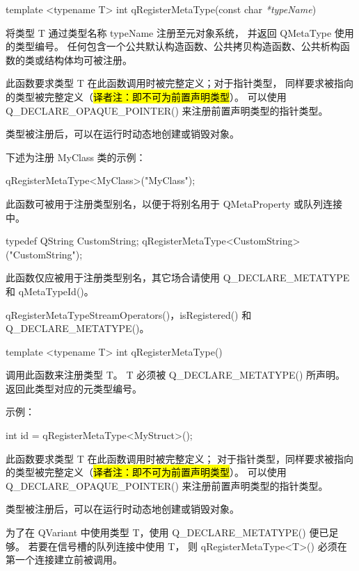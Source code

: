 template <typename T> int qRegisterMetaType(const char \emph{*typeName})

将类型 T 通过类型名称 typeName 注册至元对象系统，
并返回 QMetaType 使用的类型编号。
任何包含一个公共默认构造函数、公共拷贝构造函数、公共析构函数的类或结构体均可被注册。

此函数要求类型 T 在此函数调用时被完整定义；对于指针类型，
同样要求被指向的类型被完整定义（\hl{译者注：即不可为前置声明类型}）。
可以使用 Q\_DECLARE\_OPAQUE\_POINTER() 来注册前置声明类型的指针类型。

类型被注册后，可以在运行时动态地创建或销毁对象。

下述为注册 MyClass 类的示例：

\begin{cppcode}
qRegisterMetaType<MyClass>("MyClass");
\end{cppcode}

此函数可被用于注册类型别名，以便于将别名用于 QMetaProperty 或队列连接中。

\begin{cppcode}
typedef QString CustomString;
qRegisterMetaType<CustomString>("CustomString");
\end{cppcode}

\begin{warning}
此函数仅应被用于注册类型别名，其它场合请使用 Q\_DECLARE\_METATYPE 和 qMetaTypeId()。
\end{warning}

\begin{seeAlso}
qRegisterMetaTypeStreamOperators()，isRegistered() 和 Q\_DECLARE\_METATYPE()。
\end{seeAlso}

template <typename T> int qRegisterMetaType()

调用此函数来注册类型 T。
T 必须被 Q\_DECLARE\_METATYPE() 所声明。
返回此类型对应的元类型编号。

示例：

\begin{cppcode}
int id = qRegisterMetaType<MyStruct>();
\end{cppcode}

此函数要求类型 T 在此函数调用时被完整定义；
对于指针类型，同样要求被指向的类型被完整定义（\hl{译者注：即不可为前置声明类型}）。
可以使用 Q\_DECLARE\_OPAQUE\_POINTER() 来注册前置声明类型的指针类型。

类型被注册后，可以在运行时动态地创建或销毁对象。

为了在 QVariant 中使用类型 T，使用 Q\_DECLARE\_METATYPE() 便已足够。
若要在信号槽的队列连接中使用 T，
则 qRegisterMetaType<T>() 必须在第一个连接建立前被调用。

